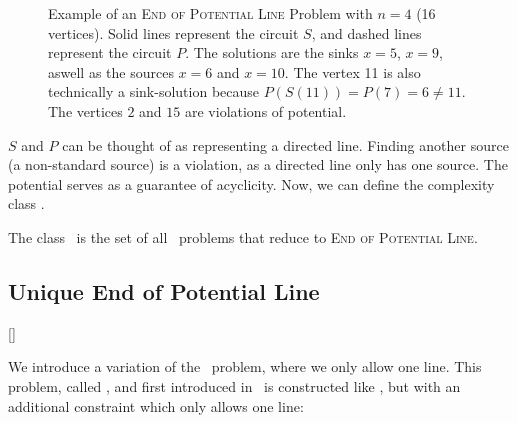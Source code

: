 
\begin{figure}[ht]
	\centering
	\caption[Example of an \EOPL\ Problem]{Example of an \textsc{End of Potential Line} Problem with $n=4$ (16 vertices). Solid lines represent the circuit $S$, and dashed lines represent the circuit $P$. The solutions are the sinks $x=5$, $x=9$, aswell as the sources $x=6$ and $x=10$. The vertex 11 is also technically a sink-solution because $P(S(11)) = P(7) = 6 \neq 11$. The vertices $2$ and $15$ are violations of potential.}\label{fig:eopl_example}
\end{figure}

$S$ and $P$ can be thought of as representing a directed line. Finding another source (a non-standard source) is a violation, as a directed line only has one source. The potential serves as a guarantee of acyclicity. Now, we can define the complexity class \EOPL\@.

\begin{definition}[\EOPL]
	The class \EOPL\ is the set of all \TFNP\ problems that reduce to \textsc{End of Potential Line}.
\end{definition}

\subsection{Unique End of Potential Line}[\UEOPL]\label{sec:ueopl}

We introduce a variation of the \EndOfPotentialLine\ problem, where we only allow one line. This problem, called \UniqueEndOfPotentialLine, and first introduced in~ is constructed like \EndOfPotentialLine, but with an additional constraint which only allows one line:

